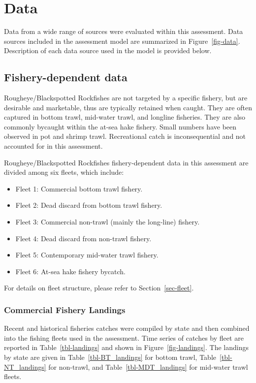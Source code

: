 \documentclass[
]{scrartcl}
\providecommand{\tightlist}{%
  \setlength{\itemsep}{0pt}\setlength{\parskip}{0pt}}\usepackage{longtable,booktabs,array}
\begin{document}
\newpage{}

\section{Data}\label{data}

Data from a wide range of sources were evaluated within this assessment.
Data sources included in the assessment model are summarized in
Figure~\ref{fig-data}. Description of each data source used in the model
is provided below.

\subsection{Fishery-dependent data}\label{sec-fishery_data}

Rougheye/Blackspotted Rockfishes are not targeted by a specific fishery,
but are desirable and marketable, thus are typically retained when
caught. They are often captured in bottom trawl, mid-water trawl, and
longline fisheries. They are also commonly bycaught within the at-sea
hake fishery. Small numbers have been observed in pot and shrimp trawl.
Recreational catch is inconsequential and not accounted for in this
assessment.

Rougheye/Blackspotted Rockfishes fishery-dependent data in this
assessment are divided among six fleets, which include:

\begin{itemize}
\tightlist
\item
  Fleet 1: Commercial bottom trawl fishery.
\item
  Fleet 2: Dead discard from bottom trawl fishery.
\item
  Fleet 3: Commercial non-trawl (mainly the long-line) fishery.
\item
  Fleet 4: Dead discard from non-trawl fishery.
\item
  Fleet 5: Contemporary mid-water trawl fishery.
\item
  Fleet 6: At-sea hake fishery bycatch.
\end{itemize}

For details on fleet structure, please refer to Section~\ref{sec-fleet}.

\subsubsection{Commercial Fishery
Landings}\label{commercial-fishery-landings}

Recent and historical fisheries catches were compiled by state and then
combined into the fishing fleets used in the assessment. Time series of
catches by fleet are reported in Table~\ref{tbl-landings} and shown in
Figure~\ref{fig-landings}. The landings by state are given in
Table~\ref{tbl-BT_landings} for bottom trawl,
Table~\ref{tbl-NT_landings} for non-trawl, and
Table~\ref{tbl-MDT_landings} for mid-water trawl fleets.
\end{document}
